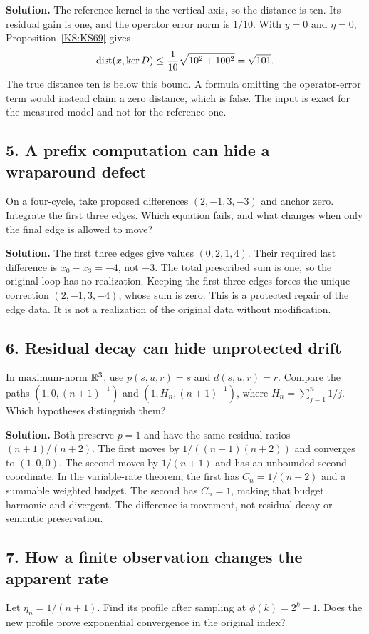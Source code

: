 \documentclass[11pt,oneside,openany]{book}
\numberwithin{equation}{section}
\begin{document}
\textbf{Solution.} The reference kernel is the vertical axis, so the distance is ten. Its residual gain is one, and the operator error norm is \(1/10\). With \(y=0\) and \(\eta=0\), Proposition~\ref{KS:KS69} gives
\[
 \operatorname{dist}(x,\ker D)\le\frac1{10}\sqrt{10^2+100^2}=\sqrt{101}.
\]
The true distance ten is below this bound. A formula omitting the operator-error term would instead claim a zero distance, which is false. The input is exact for the measured model and not for the reference one.

\subsection*{5. A prefix computation can hide a wraparound defect}
On a four-cycle, take proposed differences \((2,-1,3,-3)\) and anchor zero. Integrate the first three edges. Which equation fails, and what changes when only the final edge is allowed to move?

\textbf{Solution.} The first three edges give values \((0,2,1,4)\). Their required last difference is \(x_0-x_3=-4\), not \(-3\). The total prescribed sum is one, so the original loop has no realization. Keeping the first three edges forces the unique correction \((2,-1,3,-4)\), whose sum is zero. This is a protected repair of the edge data. It is not a realization of the original data without modification.

\subsection*{6. Residual decay can hide unprotected drift}
In maximum-norm $\mathbb R^3$, use $p(s,u,r)=s$ and $d(s,u,r)=r$. Compare the paths $(1,0,(n+1)^{-1})$ and $(1,H_n,(n+1)^{-1})$, where $H_n=\sum_{j=1}^{n}1/j$. Which hypotheses distinguish them?

\textbf{Solution.} Both preserve $p=1$ and have the same residual ratios $(n+1)/(n+2)$. The first moves by $1/((n+1)(n+2))$ and converges to $(1,0,0)$. The second moves by $1/(n+1)$ and has an unbounded second coordinate. In the variable-rate theorem, the first has $C_n=1/(n+2)$ and a summable weighted budget. The second has $C_n=1$, making that budget harmonic and divergent. The difference is movement, not residual decay or semantic preservation.

\subsection*{7. How a finite observation changes the apparent rate}
Let $\eta_n=1/(n+1)$. Find its profile after sampling at $\phi(k)=2^k-1$. Does the new profile prove exponential convergence in the original index?
\end{document}
